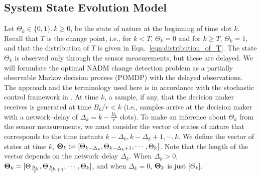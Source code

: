 \documentclass[acmtosn]{acmtrans2m}
\begin{document}
\subsection{System State Evolution Model} 
\label{subsec:system-state-evolution-model} 
Let $\Theta_k \in \{0,1\}, k \geqslant 0$, be the state of nature at the
beginning of time slot $k$. Recall that $T$ is the change point, i.e.,
for $k<T$, $\Theta_k=0$ and for $k\geqslant T$, $\Theta_k = 1$, and that
the distribution of $T$ is given in Eqn.~\ref{eqn:distribution_of_T}.
The state $\Theta_k$ is observed only through the sensor measurements,
but these are delayed. We will formulate the optimal {\sf NADM} change  
detection problem as a partially observable Markov decision process
(POMDP) with the delayed observations.
The approach and
the terminology used here is in accordance with the stochastic control
framework in \cite{books.bertsekas00a}. 
At time $k$, a sample, if any,
that the decision maker receives is generated at time $B_k/r < k$ (i.e., samples arrive at
the decision maker with a network--delay of $\Delta_k = k-\frac{B_k}{r}$
slots). 
To make an inference about $\Theta_k$ from the
sensor measurements, we must consider the vector of states of nature 
that corresponds to the time instants $k-\Delta_k, k-\Delta_k+1, \cdots,
k$. We define the vector of states at time $k$, ${\bf\Theta}_k := [\Theta_{k-\Delta_k},
\Theta_{k-\Delta_k+1}, \cdots, \Theta_k]$. Note that the length of the
vector depends on the network--delay $\Delta_k$. When $\Delta_k > 0$,
${\bf\Theta}_k =  [\Theta_{\frac{B_k}{r}},\Theta_{\frac{B_k}{r}+1},
\cdots, \Theta_k]$,
and when $\Delta_k = 0$, ${\bf\Theta}_k$ is just [$\Theta_k]$.
\end{document}
